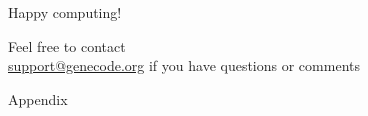 \documentclass[9pt]{beamer}
\begin{document}
\begin{frame}[plain]

\vspace{3cm}

\begin{exampleblock}{}
 \begin{center}
 \LARGE
 Happy computing!
 \end{center}
\end{exampleblock}

\vspace{3cm}

\begin{center}
\begin{minipage}{0.5\textwidth}
\begin{exampleblock}{}
\begin{center}
Feel free to contact\\
\href{mailto:support@genecode.org}{support@genecode.org}
if you have questions or comments
\end{center}
\end{exampleblock}
\end{minipage}
\end{center}

\end{frame}


\begin{frame}[plain]

\begin{exampleblock}{}
 \begin{center}
 \LARGE
 Appendix
 \end{center}
\end{exampleblock}

\end{frame}

\end{document}

